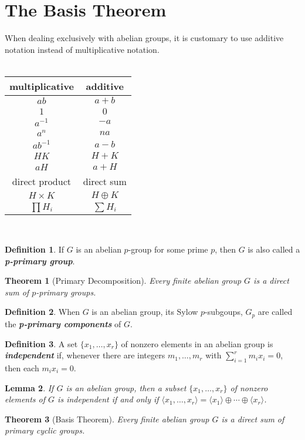 \documentclass[12pt]{report}
\newtheorem{theorem}{Theorem}[chapter]
\newtheorem{lemma}[theorem]{Lemma}
\theoremstyle{definition}
\newtheorem*{definition}{Definition}
\newcommand{\term}[1]{\textbf{\textit{#1}}}
\newcommand{\gen}[1]{{\langle}#1{\rangle}}
\begin{document}
\section{The Basis Theorem}
When dealing exclusively with abelian groups, it is customary to use additive notation instead of multiplicative notation.\\
\\
\begin{tabular}{c c}
multiplicative & additive \\ \hline
$ab$ & $a+b$ \\
$1$ & $0$ \\
$a^{-1}$ & $-a$ \\
$a^n$ & $na$ \\
$ab^{-1}$ & $a-b$ \\
$HK$ & $H+K$ \\
$aH$ & $a+H$ \\
direct product & direct sum \\
$H\times K$ & $H\oplus K$ \\
$\prod{H_i}$ & $\sum{H_i}$ \\
\end{tabular}
\\

\begin{definition}
	If $G$ is an abelian $p$-group for some prime $p$, then $G$ is also called a \term{p-primary group}.
\end{definition}

\begin{theorem}[Primary Decomposition]
	Every finite abelian group $G$ is a direct sum of $p$-primary groups.
\end{theorem}

\begin{definition}
	When $G$ is an abelian group, its Sylow $p$-subgoups, $G_p$ are called the \term{p-primary components} of $G$.
\end{definition}

\begin{definition}
	A set $\{x_1,\ldots,x_r\}$ of nonzero elements in an abelian group is \term{independent} if, whenever there are integers $m_1,\ldots,m_r$ with
	$\sum_{i=1}^r m_i x_i =0$, then each $m_i x_i = 0$.
\end{definition}

\begin{lemma}
	If $G$ is an abelian group, then a subset $\{x_1,\ldots,x_r\}$ of nonzero elements of $G$ is independent if and only if $\gen{x_1,\ldots,x_r}=\gen{x_1}\oplus\cdots\oplus\gen{x_r}$.
\end{lemma}

\setcounter{theorem}{4}

\begin{theorem}[Basis Theorem]
	Every finite abelian group $G$ is a direct sum of primary cyclic groups.
\end{theorem}
\end{document}
